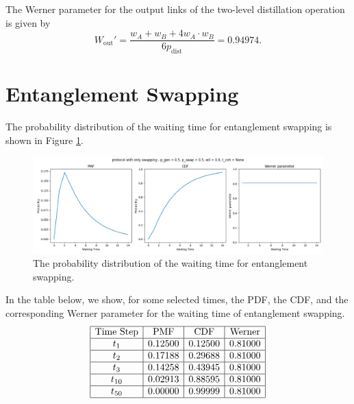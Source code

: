 \documentclass{masterthesis}
\begin{document}
The Werner parameter for the output links of the two-level distillation operation is given by
\begin{equation}
    W_{\text{out}}' = \frac{w_A + w_B + 4 w_A \cdot w_B}{6 p_{\text{dist}}} = 0.94974 .
\end{equation}

\section*{Entanglement Swapping}

The probability distribution of the waiting time for entanglement swapping is shown in Figure \ref{fig:swap_waiting_time}.
\begin{figure}[ht]
    \centering
    \includegraphics[width=1\linewidth]{images/dist_tests/only swapping.png}
    \caption{The probability distribution of the waiting time for entanglement swapping.}
    \label{fig:swap_waiting_time}
\end{figure}

In the table below, we show, for some selected times, the PDF, the CDF, and the corresponding Werner parameter for the waiting time of entanglement swapping.
\begin{equation*}
    \begin{array}{|c|c|c|c|}
        \hline
        \text{Time Step} & \text{PMF} & \text{CDF} & \text{Werner} \\
        \hline
        t_1 & 0.12500 & 0.12500 & 0.81000 \\
        \hline
        t_2 & 0.17188 & 0.29688 & 0.81000 \\
        \hline
        t_3 & 0.14258 & 0.43945 & 0.81000 \\
        \hline
        t_{10} & 0.02913 & 0.88595 & 0.81000 \\
        \hline
        t_{50} & 0.00000 & 0.99999 & 0.81000 \\
        \hline
    \end{array}
\end{equation*}
\end{document}
